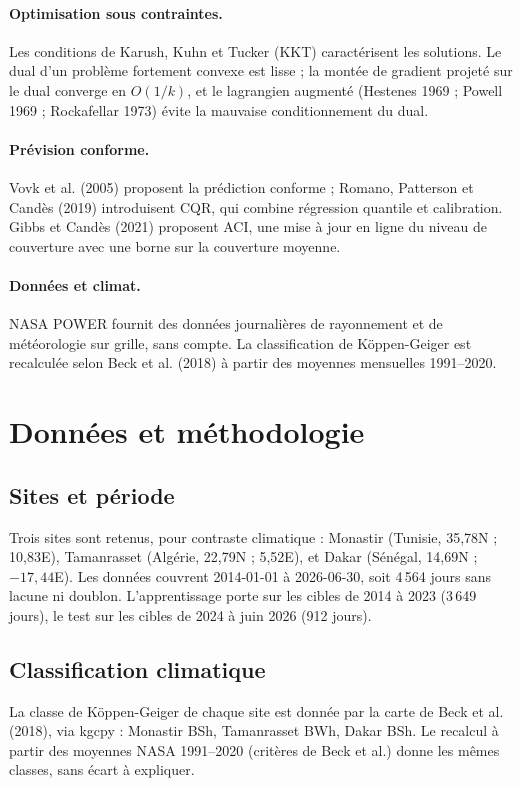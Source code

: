 \documentclass[11pt,a4paper]{article}
\theoremstyle{remark}
\theoremstyle{definition}
\begin{document}
\paragraph{Optimisation sous contraintes.} Les conditions de Karush, Kuhn et Tucker (KKT) caractérisent les solutions. Le dual
d'un problème fortement convexe est lisse ; la montée de gradient projeté sur le dual converge en $O(1/k)$, et le lagrangien augmenté
(Hestenes 1969 ; Powell 1969 ; Rockafellar 1973) évite la mauvaise conditionnement du dual.

\paragraph{Prévision conforme.} Vovk et al. (2005) proposent la prédiction conforme ; Romano, Patterson et Candès (2019) introduisent CQR,
qui combine régression quantile et calibration. Gibbs et Candès (2021) proposent ACI, une mise à jour en ligne du niveau de couverture avec une borne
sur la couverture moyenne.

\paragraph{Données et climat.} NASA POWER fournit des données journalières de rayonnement et de météorologie sur grille, sans compte.
La classification de Köppen-Geiger est recalculée selon Beck et al. (2018) à partir des moyennes mensuelles 1991--2020.

\section{Données et méthodologie}\label{sec:donnees}
\subsection{Sites et période}
Trois sites sont retenus, pour contraste climatique : Monastir (Tunisie, 35,78\textdegree{}N ; 10,83\textdegree{}E), Tamanrasset (Algérie, 22,79\textdegree{}N ; 5,52\textdegree{}E),
et Dakar (Sénégal, 14,69\textdegree{}N ; $-17{,}44$\textdegree{}E). Les données couvrent 2014-01-01 à 2026-06-30, soit 4\,564 jours sans lacune ni doublon.
L'apprentissage porte sur les cibles de 2014 à 2023 (3\,649 jours), le test sur les cibles de 2024 à juin 2026 (912 jours).

\subsection{Classification climatique}
La classe de Köppen-Geiger de chaque site est donnée par la carte de Beck et al. (2018), via kgcpy : Monastir BSh, Tamanrasset BWh, Dakar BSh.
Le recalcul à partir des moyennes NASA 1991--2020 (critères de Beck et al.) donne les mêmes classes, sans écart à expliquer.
\end{document}

